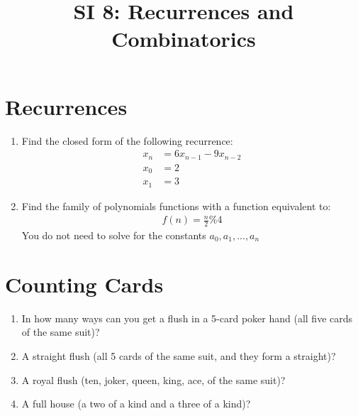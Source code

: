 \documentclass[12pt]{article}
\date{}
\author{}
\title{SI 8: Recurrences and Combinatorics}
\begin{document}
	\maketitle
\section{Recurrences}
\begin{enumerate}
	\item Find the closed form of the following recurrence:
	\begin{align*}
	x_n &= 6x_{n-1} - 9x_{n-2}\\
	x_0 &= 2\\
	x_1 &= 3
	\end{align*}
	\item Find the family of polynomials functions with a function equivalent to:
	\begin{align*}
	f(n) = \frac{n}{2}\%4
	\end{align*}
	You do not need to solve for the constants $a_0,a_1,...,a_n$
\end{enumerate}
\section{Counting Cards}
\begin{enumerate}[resume]
	\item In how many ways can you get a flush in a 5-card poker hand (all five cards of the same suit)?
	\item A straight flush (all 5 cards of the same suit, and they form a straight)?
	\item A royal flush (ten, joker, queen, king, ace, of the same suit)?
	\item A full house (a two of a kind and a three of a kind)?
\end{enumerate}
\end{document}
